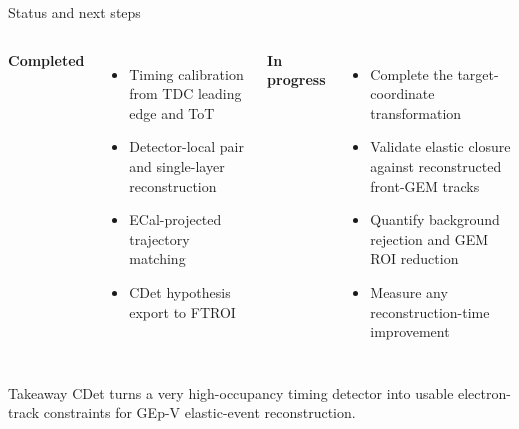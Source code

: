 \documentclass[aspectratio=169,10pt]{beamer}
\begin{document}
\begin{frame}{Status and next steps}
\begin{columns}[T,onlytextwidth]
  \textbf{Completed}
  \begin{itemize}
    \item Timing calibration from TDC leading edge and ToT
    \item Detector-local pair and single-layer reconstruction
    \item ECal-projected trajectory matching
    \item CDet hypothesis export to FTROI
  \end{itemize}
  \textbf{In progress}
  \begin{itemize}
    \item Complete the target-coordinate transformation
    \item Validate elastic closure against reconstructed front-GEM tracks
    \item Quantify background rejection and GEM ROI reduction
    \item Measure any reconstruction-time improvement
  \end{itemize}
\end{columns}
\vspace{0.3cm}
\begin{block}{Takeaway}
\centering
CDet turns a very high-occupancy timing detector into usable electron-track constraints for GEp-V elastic-event reconstruction.
\end{block}
\end{frame}
\end{document}
